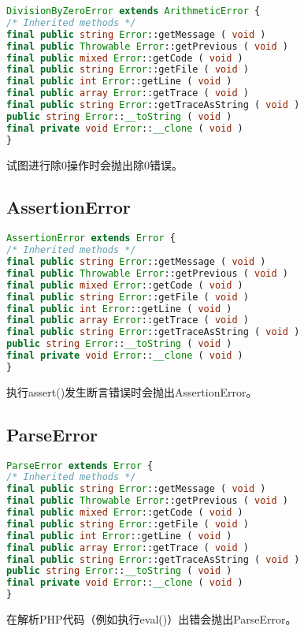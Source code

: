 \begin{lstlisting}[language=PHP]
DivisionByZeroError extends ArithmeticError {
/* Inherited methods */
final public string Error::getMessage ( void )
final public Throwable Error::getPrevious ( void )
final public mixed Error::getCode ( void )
final public string Error::getFile ( void )
final public int Error::getLine ( void )
final public array Error::getTrace ( void )
final public string Error::getTraceAsString ( void )
public string Error::__toString ( void )
final private void Error::__clone ( void )
}
\end{lstlisting}

试图进行除0操作时会抛出除0错误。


\subsection{AssertionError}

\begin{lstlisting}[language=PHP]
AssertionError extends Error {
/* Inherited methods */
final public string Error::getMessage ( void )
final public Throwable Error::getPrevious ( void )
final public mixed Error::getCode ( void )
final public string Error::getFile ( void )
final public int Error::getLine ( void )
final public array Error::getTrace ( void )
final public string Error::getTraceAsString ( void )
public string Error::__toString ( void )
final private void Error::__clone ( void )
}
\end{lstlisting}

执行assert()发生断言错误时会抛出AssertionError。

\subsection{ParseError}

\begin{lstlisting}[language=PHP]
ParseError extends Error {
/* Inherited methods */
final public string Error::getMessage ( void )
final public Throwable Error::getPrevious ( void )
final public mixed Error::getCode ( void )
final public string Error::getFile ( void )
final public int Error::getLine ( void )
final public array Error::getTrace ( void )
final public string Error::getTraceAsString ( void )
public string Error::__toString ( void )
final private void Error::__clone ( void )
}
\end{lstlisting}

在解析PHP代码（例如执行eval()）出错会抛出ParseError。

